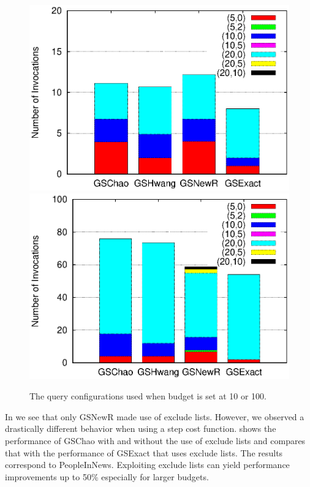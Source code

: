 \begin{figure}[h]
   	 \includegraphics[clip,scale=0.32]{figs/queryConfBudget10.eps}
	\includegraphics[clip,scale=0.32]{figs/queryConfBudget100.eps}
	\caption{The query configurations used when budget is set at 10 or 100.}\label{fig:queryconf}
		\vspace{-10pt}
\end{figure}

 In  we see that only GSNewR made use of exclude lists. However, we observed a drastically different behavior when using a step cost function.  shows the performance of GSChao with and without the use of exclude lists and compares that with the performance of GSExact that uses exclude lists. The results correspond to PeopleInNews. Exploiting exclude lists can yield performance improvements up to 50\% especially for larger budgets.

